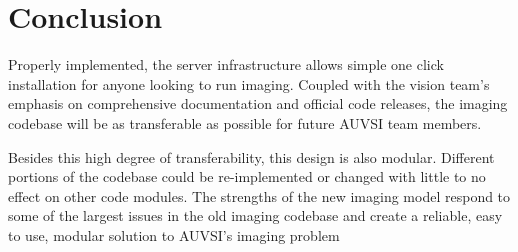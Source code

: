 \documentclass[]{auvsi_doc}
\begin{document}
\section{Conclusion}

Properly implemented, the server infrastructure allows simple one click installation
for anyone looking to run imaging. Coupled with the vision team's emphasis on comprehensive
documentation and official code releases, the imaging codebase will be as transferable as 
possible for future AUVSI team members.

Besides this high degree of transferability, this design is also modular. Different 
portions of the codebase could be re-implemented or changed with little to no effect on 
other code modules. The strengths of the new imaging model respond to some of the largest
issues in the old imaging codebase and create a reliable, easy to use, modular solution
to AUVSI's imaging problem
\end{document}
